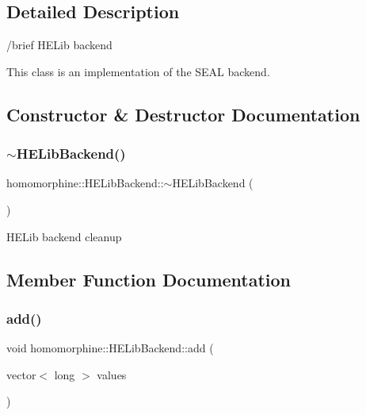 \subsection{Detailed Description}
/brief H\+E\+Lib backend

This class is an implementation of the S\+E\+AL backend. 

\subsection{Constructor \& Destructor Documentation}
\mbox{\label{classhomomorphine_1_1_h_e_lib_backend_a1ef98efe05281fefbe6d044dc474017a}} 
\subsubsection{\texorpdfstring{$\sim$HELibBackend()}{~HELibBackend()}}
{\footnotesize\ttfamily homomorphine\+::\+H\+E\+Lib\+Backend\+::$\sim$\+H\+E\+Lib\+Backend (\begin{DoxyParamCaption}{ }\end{DoxyParamCaption})}

H\+E\+Lib backend cleanup 

\subsection{Member Function Documentation}
\mbox{\label{classhomomorphine_1_1_h_e_lib_backend_a1e3c4745d7efdaac1f75c5a7fbfc3707}} 
\subsubsection{\texorpdfstring{add()}{add()}\hspace{0.1cm}{\footnotesize\ttfamily [1/2]}}
{\footnotesize\ttfamily void homomorphine\+::\+H\+E\+Lib\+Backend\+::add (\begin{DoxyParamCaption}\item[{vector$<$ long $>$}]{values }\end{DoxyParamCaption})\hspace{0.3cm}{\ttfamily [virtual]}}

